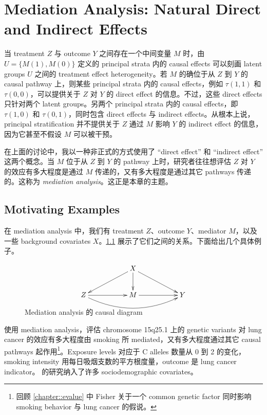  
\chapter{ Mediation Analysis: Natural Direct and Indirect Effects}
 \label{chapter::mediation}




当 treatment $Z$ 与 outcome $Y$ 之间存在一个中间变量 $M$ 时，由 $U=\{M(1),M(0)\}$ 定义的 principal strata 内的 causal effects 可以刻画 latent groups $U$ 之间的 treatment effect heterogeneity。若 $M$ 的确位于从 $Z$ 到 $Y$ 的 causal pathway 上，则某些 principal strata 内的 causal effects，例如 $\tau(1,1)$ 和 $\tau(0,0)$，可以提供关于 $Z$ 对 $Y$ 的 direct effect 的信息。不过，这些 direct effects 只针对两个 latent groups。另两个 principal strata 内的 causal effects，即 $\tau(1,0)$ 和 $\tau(0,1)$，同时包含 direct effects 与 indirect effects。从根本上说，principal stratification 并不提供关于 $Z$ 通过 $M$ 影响 $Y$ 的 indirect effect 的信息，因为它甚至不假设 $M$ 可以被干预。



在上面的讨论中，我以一种非正式的方式使用了 ``direct effect'' 和 ``indirect effect'' 这两个概念。当 $M$ 位于从 $Z$ 到 $Y$ 的 pathway 上时，研究者往往想评估 $Z$ 对 $Y$ 的效应有多大程度是通过 $M$ 传递的，又有多大程度是通过其它 pathways 传递的。这称为 {\it mediation analysis}。这正是本章的主题。



\section{Motivating Examples}





在 mediation analysis 中，我们有 treatment $Z$、outcome $Y$、mediator $M$，以及一些 background covariates $X$。\cref{fg::mediationDAG} 展示了它们之间的关系。下面给出几个具体例子。



\begin{figure}[ht]
\centering
$$
\begin{xy}
\xymatrix{
&& X \ar[dll] \ar[d] \ar[drr] \\
Z \ar[rr] \ar@/_1.5pc/[rrrr] & & M\ar[rr] & & Y}
\end{xy}
$$
\caption{Mediation analysis 的 causal diagram}\label{fg::mediationDAG}
\end{figure}


\begin{example}
\citet{Vanderweele::2012genetic} 使用 mediation analysis，评估 chromosome 15q25.1 上的 genetic variants 对 lung cancer 的效应有多大程度由 smoking 所 mediated，又有多大程度通过其它 causal pathways 起作用\footnote{回顾 \cref{chapter::evalue} 中 Fisher 关于一个 common genetic factor 同时影响 smoking behavior 与 lung cancer 的假说。}。Exposure levels 对应于 C alleles 数量从 0 到 2 的变化，smoking intensity 用每日吸烟支数的平方根度量，outcome 是 lung cancer indicator。\citet{Vanderweele::2012genetic} 的研究纳入了许多 sociodemographic covariates。  %
\end{example}



